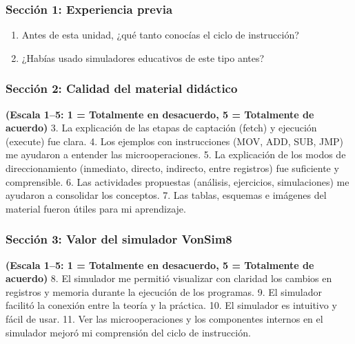 \documentclass[12pt,oneside]{templates/unerthesis}
\providecommand{\tightlist}{%
  \setlength{\itemsep}{0pt}\setlength{\parskip}{0pt}}
\begin{document}
\hypertarget{secciuxf3n-1-experiencia-previa}{%
\subsubsection{Sección 1: Experiencia previa}\label{secciuxf3n-1-experiencia-previa}}

\begin{enumerate}
\def\labelenumi{\arabic{enumi}.}
\tightlist
\item
  Antes de esta unidad, ¿qué tanto conocías el ciclo de instrucción?
\item
  ¿Habías usado simuladores educativos de este tipo antes?
\end{enumerate}

\hypertarget{secciuxf3n-2-calidad-del-material-diduxe1ctico}{%
\subsubsection{Sección 2: Calidad del material didáctico}\label{secciuxf3n-2-calidad-del-material-diduxe1ctico}}

\textbf{(Escala 1--5: 1 = Totalmente en desacuerdo, 5 = Totalmente de acuerdo)}
3. La explicación de las etapas de captación (fetch) y ejecución (execute) fue clara.
4. Los ejemplos con instrucciones (MOV, ADD, SUB, JMP) me ayudaron a entender las microoperaciones.
5. La explicación de los modos de direccionamiento (inmediato, directo, indirecto, entre registros) fue suficiente y comprensible.
6. Las actividades propuestas (análisis, ejercicios, simulaciones) me ayudaron a consolidar los conceptos.
7. Las tablas, esquemas e imágenes del material fueron útiles para mi aprendizaje.

\hypertarget{secciuxf3n-3-valor-del-simulador-vonsim8}{%
\subsubsection{Sección 3: Valor del simulador VonSim8}\label{secciuxf3n-3-valor-del-simulador-vonsim8}}

\textbf{(Escala 1--5: 1 = Totalmente en desacuerdo, 5 = Totalmente de acuerdo)}
8. El simulador me permitió visualizar con claridad los cambios en registros y memoria durante la ejecución de los programas.
9. El simulador facilitó la conexión entre la teoría y la práctica.
10. El simulador es intuitivo y fácil de usar.
11. Ver las microoperaciones y los componentes internos en el simulador mejoró mi comprensión del ciclo de instrucción.
\end{document}

